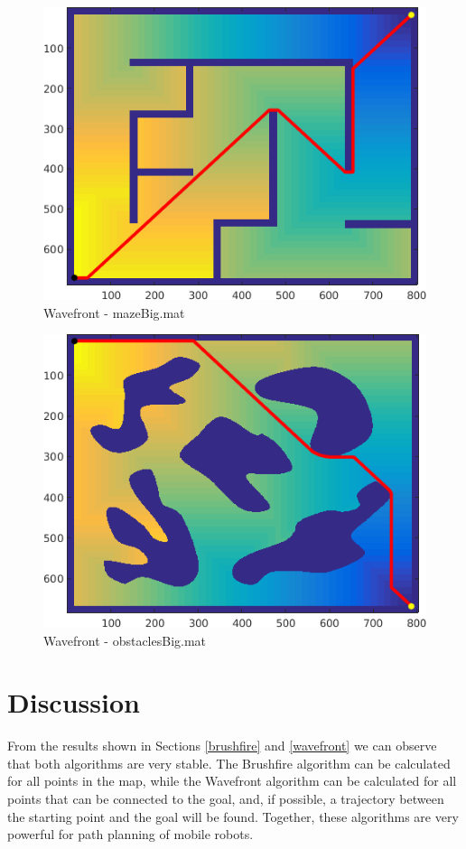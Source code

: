 \documentclass[journal]{IEEEtran}
\begin{document}
\begin{figure}\label{mazeBig_wf}
	\centering
	\includegraphics[width=0.8\linewidth]{figures/mazeBig_wf.png}
	\caption{Wavefront - mazeBig.mat}
\end{figure}

\begin{figure}\label{obstaclesBig_wf}
	\centering
	\includegraphics[width=0.8\linewidth]{figures/obstaclesBig_wf.png}
	\caption{Wavefront - obstaclesBig.mat}
\end{figure}



\section{Discussion}\label{discussion}

From the results shown in Sections \ref{brushfire} and \ref{wavefront} we can observe that both algorithms are very stable. The Brushfire algorithm can be calculated for all points in the map, while the Wavefront algorithm can be calculated for all points that can be connected to the goal, and, if possible, a trajectory between the starting point and the goal will be found. Together, these algorithms are very powerful for path planning of mobile robots.
\end{document}

